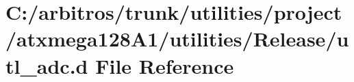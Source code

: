 \hypertarget{utilities_2project_2atxmega128_a1_2utilities_2_release_2utl__adc_8d}{\section{C\-:/arbitros/trunk/utilities/project/atxmega128\-A1/utilities/\-Release/utl\-\_\-adc.d File Reference}
\label{utilities_2project_2atxmega128_a1_2utilities_2_release_2utl__adc_8d}
}
